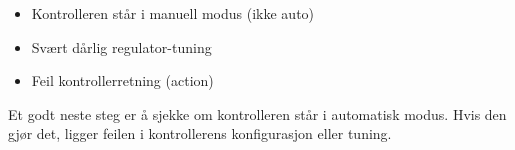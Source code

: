 \begin{itemize}
\item{} Kontrolleren står i manuell modus (ikke auto)
\item{} Svært dårlig regulator-tuning
\item{} Feil kontrollerretning (action)
\end{itemize}

Et godt neste steg er å sjekke om kontrolleren står i automatisk modus.  Hvis den gjør det, ligger feilen i kontrollerens konfigurasjon eller tuning.









